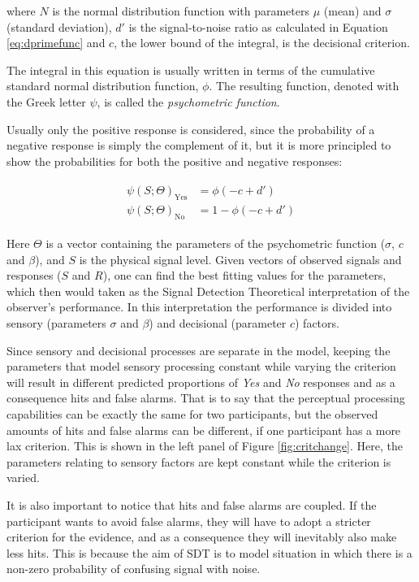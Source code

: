 \documentclass{article}\usepackage{knitr}
\begin{document}
where $N$ is the normal distribution function with parameters $\mu$ (mean) and $\sigma$ (standard deviation), $d'$ is the signal-to-noise ratio as calculated in Equation \ref{eq:dprimefunc} and $c$, the lower bound of the integral, is the decisional criterion. 

The integral in this equation is usually written in terms of the cumulative standard normal distribution function, $\phi$. The resulting function, denoted with the Greek letter $\psi$, is called the \textit{psychometric function}. \cite[Chapter 4]{kingdomprins2010}

Usually only the positive response is considered, since the probability of a negative response is simply the complement of it, but it is more principled to show the probabilities for both the positive and negative responses:

\begin{align*}
\begin{split}
\psi(S; \Theta)_{\text{Yes}} &= \phi(-c + d') \\
\psi(S; \Theta)_{\text{No}} &=  1 - \phi(-c + d')
\end{split}
\end{align*}

Here $\Theta$ is a vector containing the parameters of the psychometric function ($\sigma$, $c$ and $\beta$), and $S$ is the physical signal level. Given vectors of observed signals and responses ($S$ and $R$), one can find the best fitting values for the parameters, which then would taken as the Signal Detection Theoretical interpretation of the observer's performance. In this interpretation the performance is divided into sensory (parameters $\sigma$ and $\beta$) and decisional (parameter $c$) factors.

Since sensory and decisional processes are separate in the model, keeping the parameters that model sensory processing constant while varying the criterion will result in different predicted proportions of \textit{Yes} and \textit{No} responses and as a consequence hits and false alarms. That is to say that the perceptual processing capabilities can be exactly the same for two participants, but the observed amounts of hits and false alarms can be different, if one participant has a more lax criterion. This is shown in the left panel of Figure \ref{fig:critchange}. Here, the parameters relating to sensory factors are kept constant while the criterion is varied.

It is also important to notice that hits and false alarms are coupled. If the participant wants to avoid false alarms, they will have to adopt a stricter criterion for the evidence, and  as a consequence they  will inevitably also make less hits. This is because the aim of SDT is to model situation in which there is a non-zero probability of confusing signal with noise. 
\end{document}
